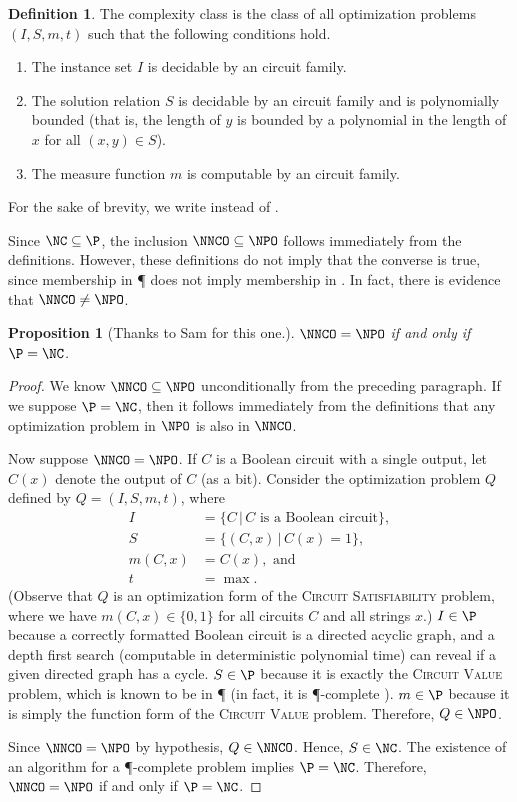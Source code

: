 \documentclass[]{article}
\theoremstyle{plain}
\newtheorem{proposition}{Proposition}
\theoremstyle{definition}
\newtheorem{definition}{Definition}
\begin{document}
\begin{definition}\label{def:nnco}
  The complexity class \NNCOpoly{} is the class of all optimization problems $(I, S, m, t)$ such that the following conditions hold.
  \begin{enumerate}
  \item The instance set $I$ is decidable by an \NC{} circuit family.
  \item The solution relation $S$ is decidable by an \NC{} circuit family and is polynomially bounded (that is, the length of $y$ is bounded by a polynomial in the length of $x$ for all $(x, y)\in S$).
  \item The measure function $m$ is computable by an \FNC{} circuit family.
  \end{enumerate}
  For the sake of brevity, we write \NNCO{} instead of \NNCOpoly{}.
\end{definition}

Since $\NC\subseteq\P$, the inclusion $\NNCO\subseteq\NPO$ follows immediately from the definitions.
However, these definitions do not imply that the converse is true, since membership in \P{} does not imply membership in \NC.
In fact, there is evidence that $\NNCO \neq \NPO$.
\begin{proposition}[Thanks to Sam for this one.]\label{prop:nnconpo}
  $\NNCO = \NPO$ if and only if $\P = \NC$.
\end{proposition}
\begin{proof}
  We know $\NNCO \subseteq \NPO$ unconditionally from the preceding paragraph.
  If we suppose $\P = \NC$, then it follows immediately from the definitions that any optimization problem in $\NPO$ is also in $\NNCO$.

  Now suppose $\NNCO = \NPO$.
  If $C$ is a Boolean circuit with a single output, let $C(x)$ denote the output of $C$ (as a bit).
  Consider the optimization problem $Q$ defined by $Q = (I, S, m, t)$, where
  \begin{align*}
    I & = \{ C \, | \, C \text{ is a Boolean circuit} \}, \\
    S & = \{ (C, x) \, | \, C(x) = 1 \}, \\
    m(C, x) & = C(x), \text{ and} \\
    t & = \max.
  \end{align*}
  (Observe that $Q$ is an optimization form of the \textsc{Circuit Satisfiability} problem, where we have $m(C, x) \in \{0, 1\}$ for all circuits $C$ and all strings $x$.)
  $I \in \P$ because a correctly formatted Boolean circuit is a directed acyclic graph, and a depth first search (computable in deterministic polynomial time) can reveal if a given directed graph has a cycle.
  $S \in \P$ because it is exactly the \textsc{Circuit Value} problem, which is known to be in \P{} (in fact, it is \P-complete \cite[Problem~A.1.1]{ghr95}).
  $m \in \P$ because it is simply the function form of the \textsc{Circuit Value} problem.
  Therefore, $Q \in \NPO$.

  Since $\NNCO = \NPO$ by hypothesis, $Q \in \NNCO$.
  Hence, $S \in \NC$.
  The existence of an \NC{} algorithm for a \P-complete problem implies $\P = \NC$.
  Therefore, $\NNCO = \NPO$ if and only if $\P = \NC$.
\end{proof}
\end{document}
